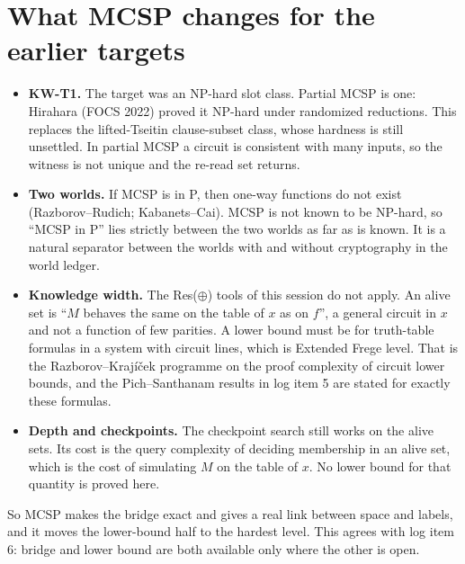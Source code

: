 \documentclass[11pt]{article}
\begin{document}
\section{What MCSP changes for the earlier targets}
\begin{itemize}
\item \textbf{KW-T1.} The target was an NP-hard slot class. Partial MCSP is one: Hirahara (FOCS 2022) proved it NP-hard under randomized reductions. This replaces the lifted-Tseitin clause-subset class, whose hardness is still unsettled. In partial MCSP a circuit is consistent with many inputs, so the witness is not unique and the re-read set returns.
\item \textbf{Two worlds.} If MCSP is in P, then one-way functions do not exist (Razborov--Rudich; Kabanets--Cai). MCSP is not known to be NP-hard, so ``MCSP in P'' lies strictly between the two worlds as far as is known. It is a natural separator between the worlds with and without cryptography in the world ledger.
\item \textbf{Knowledge width.} The Res($\oplus$) tools of this session do not apply. An alive set is ``$M$ behaves the same on the table of $x$ as on $f$'', a general circuit in $x$ and not a function of few parities. A lower bound must be for truth-table formulas in a system with circuit lines, which is Extended Frege level. That is the Razborov--Kraj\'i\v{c}ek programme on the proof complexity of circuit lower bounds, and the Pich--Santhanam results in log item 5 are stated for exactly these formulas.
\item \textbf{Depth and checkpoints.} The checkpoint search still works on the alive sets. Its cost is the query complexity of deciding membership in an alive set, which is the cost of simulating $M$ on the table of $x$. No lower bound for that quantity is proved here.
\end{itemize}
So MCSP makes the bridge exact and gives a real link between space and labels, and it moves the lower-bound half to the hardest level. This agrees with log item 6: bridge and lower bound are both available only where the other is open.
\end{document}
